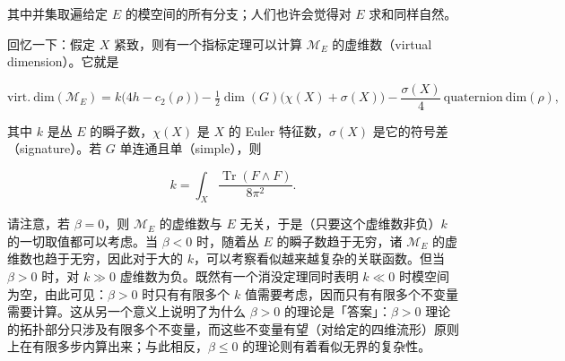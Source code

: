 其中并集取遍给定 $E$ 的模空间的所有分支；人们也许会觉得对 $E$ 求和同样自然。

回忆一下：假定 $X$ 紧致，则有一个指标定理可以计算 $\mathcal M_E$ 的虚维数（virtual dimension）。它就是

\[
  \mathrm{virt.\ dim}(\mathcal M_E)
  =k\bigl(4h-c_2(\rho)\bigr)
  -\tfrac12\dim(G)\bigl(\chi(X)+\sigma(X)\bigr)
  -\frac{\sigma(X)}{4}\,\mathrm{quaternion\ dim}(\rho),
\]

其中 $k$ 是丛 $E$ 的瞬子数，$\chi(X)$ 是 $X$ 的 Euler 特征数，$\sigma(X)$ 是它的符号差（signature）。若 $G$ 单连通且单（simple），则

\[
  k=\int_X\frac{\operatorname{Tr}(F\wedge F)}{8\pi^2}.
\]



请注意，若 $\beta=0$，则 $\mathcal M_E$ 的虚维数与 $E$ 无关，于是（只要这个虚维数非负）$k$ 的一切取值都可以考虑。当 $\beta<0$ 时，随着丛 $E$ 的瞬子数趋于无穷，诸 $\mathcal M_E$ 的虚维数也趋于无穷，因此对于大的 $k$，可以考察看似越来越复杂的关联函数。但当 $\beta>0$ 时，对 $k\gg0$ 虚维数为负。既然有一个消没定理同时表明 $k\ll0$ 时模空间为空，由此可见：$\beta>0$ 时只有有限多个 $k$ 值需要考虑，因而只有有限多个不变量需要计算。这从另一个意义上说明了为什么 $\beta>0$ 的理论是「答案」：$\beta>0$ 理论的拓扑部分只涉及有限多个不变量，而这些不变量有望（对给定的四维流形）原则上在有限多步内算出来；与此相反，$\beta\le0$ 的理论则有着看似无界的复杂性。

